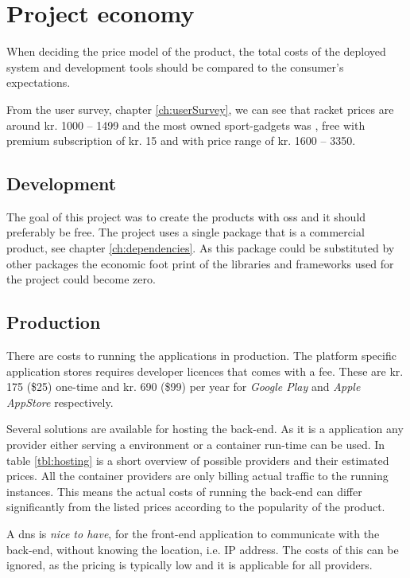 \chapter{Project economy}
When deciding the price model of the product, the total costs of the deployed system and development tools should be compared to the consumer’s expectations.

From the user survey, chapter \ref{ch:userSurvey}, we can see that racket prices are around kr. 1000 – 1499 and the most owned sport-gadgets was , free with premium subscription of kr. 15 and  with price range of kr. 1600 – 3350.

\section{Development}
The goal of this project was to create the products with \gls{oss} and it should preferably be free.
The project uses a single package that is a commercial product, see chapter \ref{ch:dependencies}.
As this package could be substituted by other packages the economic foot print of the libraries and frameworks used for the project could become zero.

\section{Production}
There are costs to running the applications in production.
The platform specific application stores requires developer licences that comes with a fee.
These are kr. 175 (\$25) one-time \citep{economy:play} and kr. 690 (\$99) per year \citep{economy:appStore} for \textit{Google Play} and \textit{Apple AppStore} respectively.

Several solutions are available for hosting the back-end.
As it is a  application any provider either serving a  environment or a container run-time can be used.
In table \ref{tbl:hosting} is a short overview of possible providers and their estimated prices.
All the container providers are only billing actual traffic to the running instances.
This means the actual costs of running the back-end can differ significantly from the listed prices according to the popularity of the product.

A \gls{dns} is \textit{nice to have}, for the front-end application to communicate with the back-end, without knowing the location, i.e. IP address.
The costs of this can be ignored, as the pricing is typically low and it is applicable for all providers.

